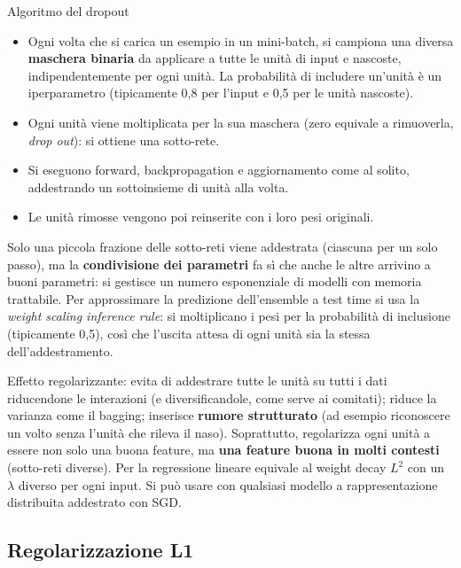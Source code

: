 \begin{boxabstract}{Algoritmo del dropout}

\begin{itemize}
\tightlist
\item
  Ogni volta che si carica un esempio in un mini-batch, si campiona una
  diversa \textbf{maschera binaria} da applicare a tutte le unità di
  input e nascoste, indipendentemente per ogni unità. La probabilità di
  includere un'unità è un iperparametro (tipicamente 0,8 per l'input e
  0,5 per le unità nascoste).
\item
  Ogni unità viene moltiplicata per la sua maschera (zero equivale a
  rimuoverla, \emph{drop out}): si ottiene una sotto-rete.
\item
  Si eseguono forward, backpropagation e aggiornamento come al solito,
  addestrando un sottoinsieme di unità alla volta.
\item
  Le unità rimosse vengono poi reinserite con i loro pesi originali.
\end{itemize}

\end{boxabstract}

Solo una piccola frazione delle sotto-reti viene addestrata (ciascuna
per un solo passo), ma la \textbf{condivisione dei parametri} fa sì che
anche le altre arrivino a buoni parametri: si gestisce un numero
esponenziale di modelli con memoria trattabile. Per approssimare la
predizione dell'ensemble a test time si usa la \emph{weight scaling
inference rule}: si moltiplicano i pesi per la probabilità di inclusione
(tipicamente 0,5), così che l'uscita attesa di ogni unità sia la stessa
dell'addestramento.

Effetto regolarizzante: evita di addestrare tutte le unità su tutti i
dati riducendone le interazioni (e diversificandole, come serve ai
comitati); riduce la varianza come il bagging; inserisce \textbf{rumore
strutturato} (ad esempio riconoscere un volto senza l'unità che rileva
il naso). Soprattutto, regolarizza ogni unità a essere non solo una
buona feature, ma \textbf{una feature buona in molti contesti}
(sotto-reti diverse). Per la regressione lineare equivale al weight
decay \(L^2\) con un \(\lambda\) diverso per ogni input. Si può usare
con qualsiasi modello a rappresentazione distribuita addestrato con SGD.

\subsection{Regolarizzazione L1}\label{regolarizzazione-l1}

